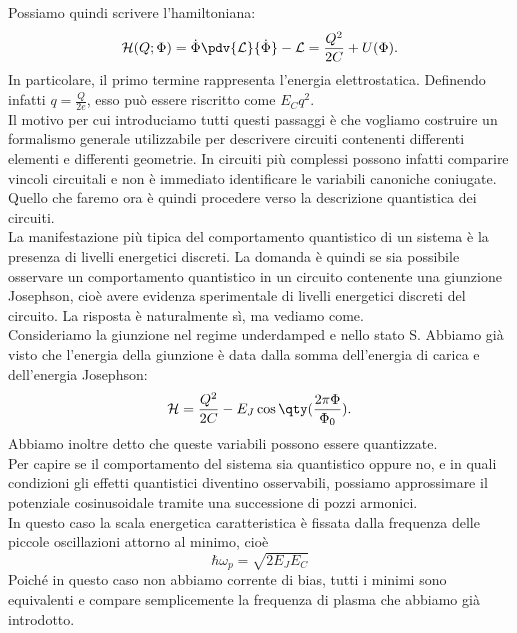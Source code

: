 Possiamo quindi scrivere l'hamiltoniana:
\begin{equation*}
    \mathcal{H}(Q;\Phi)
    =
    \dot{\Phi}
    \pdv{\mathcal{L}}{\dot{\Phi}}
    -
    \mathcal{L}
    =
    \frac{Q^2}{2C}
    +
    U(\Phi).
\end{equation*}
In particolare, il primo termine rappresenta l'energia elettrostatica. Definendo infatti $q=\frac{Q}{2e}$, esso può essere riscritto come $E_C q^2$.\\
Il motivo per cui introduciamo tutti questi passaggi è che vogliamo costruire un formalismo generale utilizzabile per descrivere circuiti contenenti differenti elementi e differenti geometrie. In circuiti più complessi possono infatti comparire vincoli circuitali e non è immediato identificare le variabili canoniche coniugate.\\
Quello che faremo ora è quindi procedere verso la descrizione quantistica dei circuiti.\\
La manifestazione più tipica del comportamento quantistico di un sistema è la presenza di livelli energetici discreti. La domanda è quindi se sia possibile osservare un comportamento quantistico in un circuito contenente una giunzione Josephson, cioè avere evidenza sperimentale di livelli energetici discreti del circuito. La risposta è naturalmente sì, ma vediamo come.\\
Consideriamo la giunzione nel regime underdamped e nello stato S. Abbiamo già visto che l'energia della giunzione è data dalla somma dell'energia di carica e dell'energia Josephson:
\begin{equation*}
    \mathcal{H}
    =
    \frac{Q^2}{2C}
    -
    E_J
    \cos{
        \qty(
            \frac{2\pi\Phi}{\Phi_0}
        )
    }.
\end{equation*}
Abbiamo inoltre detto che queste variabili possono essere quantizzate.\\
Per capire se il comportamento del sistema sia quantistico oppure no, e in quali condizioni gli effetti quantistici diventino osservabili, possiamo approssimare il potenziale cosinusoidale tramite una successione di pozzi armonici.\\
In questo caso la scala energetica caratteristica è fissata dalla frequenza delle piccole oscillazioni attorno al minimo, cioè
\begin{equation*}
    \hbar\omega_p
    =
    \sqrt{2E_JE_C}
\end{equation*}
Poiché in questo caso non abbiamo corrente di bias, tutti i minimi sono equivalenti e compare semplicemente la frequenza di plasma che abbiamo già introdotto.\\
